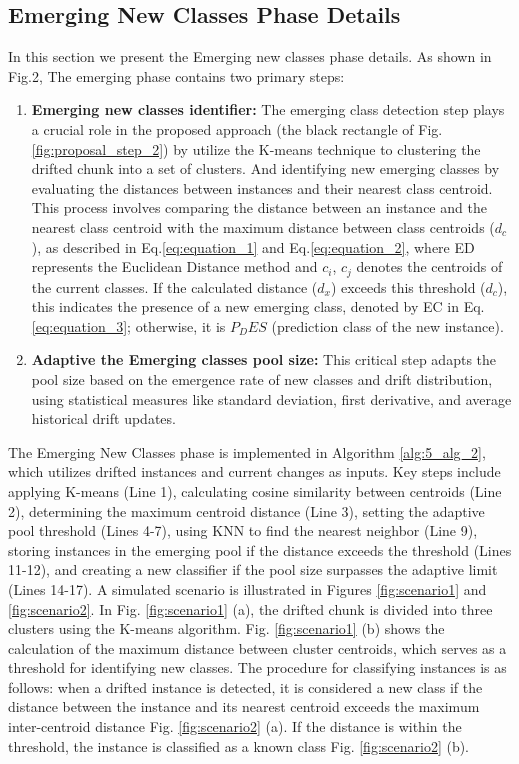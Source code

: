\subsection{Emerging New Classes Phase Details}
\label{sec:emerging_phase}
In this section we present the Emerging new classes phase details. As shown in Fig.2, The emerging phase contains two primary steps:
\begin{enumerate}
	\item \textbf{Emerging new classes identifier:} The emerging class detection step plays a crucial role in the proposed approach (the black rectangle of Fig. \ref{fig:proposal_step_2}) by utilize the K-means technique to clustering the drifted chunk into a set of clusters. And identifying new emerging classes by evaluating the distances between instances and their nearest class centroid. This process involves comparing the distance between an instance and the nearest class centroid with the maximum distance between class centroids ($d_c$), as described in Eq.\ref{eq:equation_1} and Eq.\ref{eq:equation_2}, where ED represents the Euclidean Distance method and $c_i$, $c_j$ denotes the centroids of the current classes. If the calculated distance ($d_x$) exceeds this threshold ($d_c$), this indicates the presence of a new emerging class, denoted by EC in Eq. \ref{eq:equation_3}; otherwise, it is $P_DES$ (prediction class of the new instance).
	\item \textbf{Adaptive the Emerging classes pool size:} This critical step adapts the pool size based on the emergence rate of new classes and drift distribution, using statistical measures like standard deviation, first derivative, and average historical drift updates.
\end{enumerate}
The Emerging New Classes phase is implemented in Algorithm \ref{alg:5_alg_2}, which utilizes drifted instances and current changes as inputs. Key steps include applying K-means (Line 1), calculating cosine similarity between centroids (Line 2), determining the maximum centroid distance (Line 3), setting the adaptive pool threshold (Lines 4-7), using KNN to find the nearest neighbor (Line 9), storing instances in the emerging pool if the distance exceeds the threshold (Lines 11-12), and creating a new classifier if the pool size surpasses the adaptive limit (Lines 14-17). A simulated scenario is illustrated in Figures  \ref{fig:scenario1} and  \ref{fig:scenario2}. In Fig. \ref{fig:scenario1} (a), the drifted chunk is divided into three clusters using the K-means algorithm. Fig. \ref{fig:scenario1} (b) shows the calculation of the maximum distance between cluster centroids, which serves as a threshold for identifying new classes. The procedure for classifying instances is as follows: when a drifted instance is detected, it is considered a new class if the distance between the instance and its nearest centroid exceeds the maximum inter-centroid distance Fig. \ref{fig:scenario2} (a). If the distance is within the threshold, the instance is classified as a known class Fig. \ref{fig:scenario2} (b).

